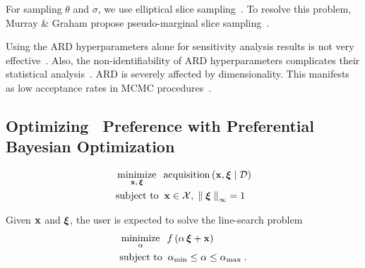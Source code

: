 For sampling \(\theta\) and \(\sigma\), we use elliptical slice sampling~\cite{murray_elliptical_2010}.
To resolve this problem, Murray \& Graham propose pseudo-marginal slice sampling~\cite{pmlr-v51-murray16}.

Using the ARD hyperparameters alone for sensitivity analysis results is not very effective~\cite{pmlr-v89-paananen19a}.
Also, the non-identifiability of ARD hyperparameters complicates their statistical analysis~\cite{zhang_inconsistent_2004a}.
ARD is severely affected by dimensionality.
This manifests as low acceptance rates in MCMC procedures~\cite{filippone_pseudomarginal_2014}.

\subsection{Optimizing \User~Preference with Preferential Bayesian Optimization}\label{section:bo}

\begin{align}
 &\operatorname*{minimize}_{\mathbf{x},\, \bm{\xi}}\;\; \mathrm{acquisition}\,(\mathbf{x}, \bm{\xi} \mid \mathcal{D}) \\
 &\text{subject to}\;\; \mathbf{x} \in \mathcal{X},\; {\parallel \bm{\xi} \parallel}_{\infty} = 1
\end{align}

Given \(\mathbf{x}\) and \(\bm{\xi}\), the user is expected to solve the line-search problem
\begin{align}
 &\operatorname*{minimize}_{ \alpha }\;\; f\,(\alpha\,\bm{\xi} + \mathbf{x}) \\
 &\text{subject to}\;\; \alpha_{\text{min}} \leq \alpha \leq \alpha_{\text{max}}\;.
\end{align}


